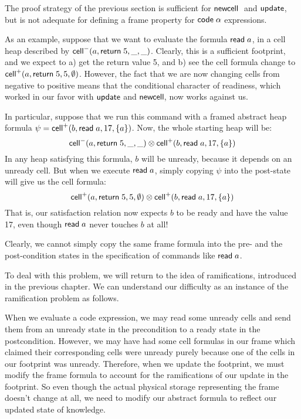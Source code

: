 The proof strategy of the previous section is sufficient for
$\mathsf{newcell}\;$ and $\mathsf{update}$, but is not adequate for defining a frame
property for $\mathsf{code}\;{\alpha}$ expressions.

As an example, suppose that we want to evaluate the formula $\mathsf{read}\;
a$, in a cell heap described by $\mathsf{cell}^{-}({a}, {\mathsf{return}\; 5}, {\_}, {\_})$.  Clearly,
this is a sufficient footprint, and we expect to a) get the return
value 5, and b) see the cell formula change to $\mathsf{cell}^{+}({a}, {\mathsf{return}\;
  5}, {5}, {\emptyset})$.  However, the fact that we are now changing cells
from negative to positive means that the conditional character of
readiness, which worked in our favor with $\mathsf{update}$ and
$\mathsf{newcell}\;\!\!$, now works against us.

In particular, suppose that we run this command with a framed abstract heap
formula $\psi = \mathsf{cell}^{+}({b}, {\mathsf{read}\; a}, {17}, {\{{a}\}})$. Now, the
whole starting heap will be:
\begin{displaymath}
\mathsf{cell}^{-}({a}, {\mathsf{return}\; 5}, {\_}, {\_}) \otimes \mathsf{cell}^{+}({b}, {\mathsf{read}\; a}, {17}, {\{{a}\}})  
\end{displaymath}
In any heap satisfying this formula, $b$ will be unready, because it depends 
on an unready cell. But when we execute $\mathsf{read}\; a$, simply copying $\psi$ 
into the post-state will give us the cell formula:
\begin{displaymath}
\mathsf{cell}^{+}({a}, {\mathsf{return}\; 5}, {5}, {\emptyset}) \otimes \mathsf{cell}^{+}({b}, {\mathsf{read}\; a}, {17}, {\{{a}\}})
\end{displaymath}
That is, our satisfaction relation now expects $b$ to be ready and have the 
value 17, even though $\mathsf{read}\; a$ never touches $b$ at all!

Clearly, we cannot simply copy the same frame formula into the pre-
and the post-condition states in the specification of commands like
$\mathsf{read}\; a$.

To deal with this problem, we will return to the idea of
ramifications, introduced in the previous chapter. We can understand
our difficulty as an instance of the ramification problem as
follows. 

When we evaluate a code expression, we may read some unready cells and
send them from an unready state in the precondition to a ready state
in the postcondition. However, we may have had some cell formulas in
our frame which claimed their corresponding cells were unready purely
because one of the cells in our footprint was unready. Therefore, when
we update the footprint, we must modify the frame formula to account
for the ramifications of our update in the footprint. So even though
the actual physical storage representing the frame doesn't change at
all, we need to modify our abstract formula to reflect our updated
state of knowledge.

